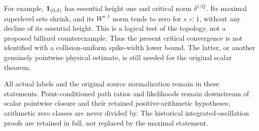 For example, $\mathbf1_{(0,\delta)}$ has essential height one and
critical norm $\delta^{1/Q}$. Its maximal superlevel sets shrink,
and its $W^{s,1}$ norm tends to zero for $s<1$, without any decline
of its essential height. This is a logical test of the topology,
not a proposed billiard counterexample. Thus the present critical
convergence is not identified with a collision-uniform spike-width
lower bound. The latter, or another genuinely pointwise physical
estimate, is still needed for the original scalar theorem.

All actual labels and the original source normalization remain in
these statements. Point-conditioned path ratios and likelihoods
remain downstream of scalar pointwise closure and their retained
positive-arithmetic hypotheses; arithmetic zero classes are never
divided by. The historical integrated-oscillation proofs are retained
in full, not replaced by the maximal statement.
